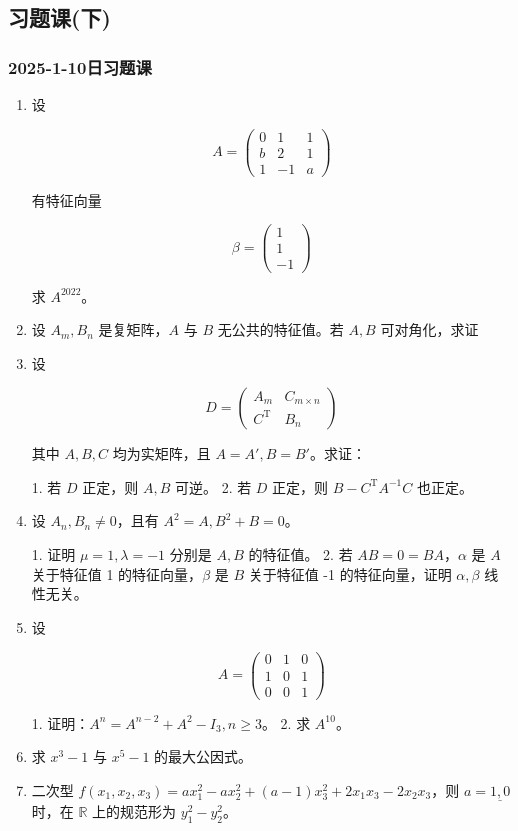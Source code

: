 \subsection{习题课(下)}

\subsubsection{2025-1-10日习题课}

\begin{enumerate}
    \item 设

    $$
    A=\begin{pmatrix}
    0 &1 &1\\
    b &2 &1\\
    1 &-1 &a
    \end{pmatrix}
    $$
    
    有特征向量
    
    $$
    \beta=\begin{pmatrix}
    1\\1\\-1
    \end{pmatrix}
    $$
    
    求 $A^{2022}$。
    \item 设 $A_m,B_n$ 是复矩阵，$A$ 与 $B$ 无公共的特征值。若 $A,B$ 可对角化，求证
    \item 设

    $$
    D=\begin{pmatrix}
    A_m &C_{m \times n}\\
    C^{\mathrm{T}} &B_n
    \end{pmatrix}
    $$
    
    其中 $A,B,C$ 均为实矩阵，且 $A=A',B=B'$。求证：
    
    1. 若 $D$ 正定，则 $A,B$ 可逆。
    2. 若 $D$ 正定，则 $B-C^{\mathrm{T}}A^{-1}C$ 也正定。
    \item 设 $A_n,B_n \not= 0$，且有 $A^2=A,B^2+B=0$。

    1. 证明 $\mu=1,\lambda=-1$ 分别是 $A,B$ 的特征值。
    2. 若 $AB=0=BA$，$\alpha$ 是 $A$ 关于特征值 1 的特征向量，$\beta$ 是 $B$ 关于特征值 -1 的特征向量，证明 $\alpha,\beta$ 线性无关。
    \item 设

    $$
    A=\begin{pmatrix}
    0 &1 &0\\
    1 &0 &1\\
    0 &0 &1
    \end{pmatrix}
    $$
    
    1. 证明：$A^n=A^{n-2}+A^2-I_3,n \ge 3$。
    2. 求 $A^{10}$。
    \item 求 $x^3-1$ 与 $x^5-1$ 的最大公因式。
    \item 二次型 $f(x_1,x_2,x_3)=ax_1^2-ax_2^2+(a-1)x_3^2+2x_1x_3-2x_2x_3$，则 ${} a=\underline{1,0} {}$ 时，在 $\mathbb{R}$ 上的规范形为 $y_1^2-y_2^2$。
\end{enumerate}

